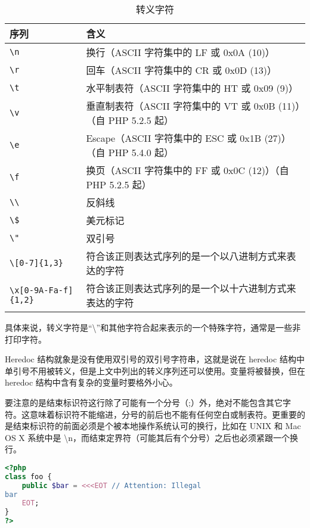 \begin{table}[!ht]
\centering
\caption{转义字符}
\begin{tabular}{|l|l|}
\hline
序列	&含义\\
\hline
\texttt{\textbackslash n}	&换行（ASCII 字符集中的 LF 或 0x0A (10)）\\
\hline
\texttt{\textbackslash r}	&回车（ASCII 字符集中的 CR 或 0x0D (13)）\\
\hline
\texttt{\textbackslash t}	&水平制表符（ASCII 字符集中的 HT 或 0x09 (9)）\\
\hline
\texttt{\textbackslash v}	&垂直制表符（ASCII 字符集中的 VT 或 0x0B (11)）（自 PHP 5.2.5 起）\\
\hline
\texttt{\textbackslash e}	&Escape（ASCII 字符集中的 ESC 或 0x1B (27)）（自 PHP 5.4.0 起）\\
\hline
\texttt{\textbackslash f}	&换页（ASCII 字符集中的 FF 或 0x0C (12)）（自 PHP 5.2.5 起）\\
\hline
\texttt{\textbackslash \textbackslash}	&反斜线\\
\hline
\texttt{\textbackslash \$}	&美元标记\\
\hline
\texttt{\textbackslash "}	&双引号\\
\hline
\texttt{\textbackslash [0-7]\{1,3\}}	 &符合该正则表达式序列的是一个以八进制方式来表达的字符\\
\hline
\texttt{\textbackslash x[0-9A-Fa-f]\{1,2\}}	 &符合该正则表达式序列的是一个以十六进制方式来表达的字符\\
\hline
\end{tabular}
\end{table}


具体来说，转义字符是“\textbackslash”和其他字符合起来表示的一个特殊字符，通常是一些非打印字符。



Heredoc 结构就象是没有使用双引号的双引号字符串，这就是说在 heredoc 结构中单引号不用被转义，但是上文中列出的转义序列还可以使用。变量将被替换，但在 heredoc 结构中含有复杂的变量时要格外小心。

要注意的是结束标识符这行除了可能有一个分号（;）外，绝对不能包含其它字符。这意味着标识符不能缩进，分号的前后也不能有任何空白或制表符。更重要的是结束标识符的前面必须是个被本地操作系统认可的换行，比如在 UNIX 和 Mac OS X 系统中是 \textbackslash n，而结束定界符（可能其后有个分号）之后也必须紧跟一个换行。

\begin{lstlisting}[language=PHP]
<?php
class foo {
    public $bar = <<<EOT // Attention: Illegal
bar
    EOT;
}
?>
\end{lstlisting}

